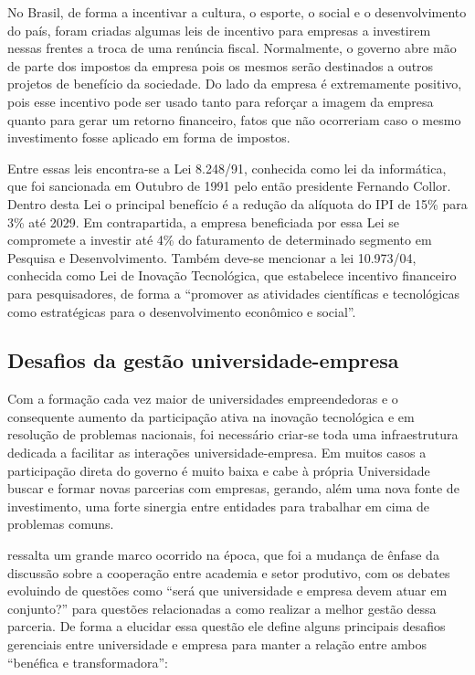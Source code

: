 No Brasil, de forma a incentivar a cultura, o esporte, o social e o desenvolvimento do país, foram criadas algumas leis de incentivo para empresas a investirem nessas frentes a troca de uma renúncia fiscal.  Normalmente, o governo abre mão de parte dos impostos da empresa pois os mesmos serão destinados a outros projetos de benefício da sociedade. Do lado da empresa é extremamente positivo, pois esse incentivo pode ser usado tanto para reforçar a imagem da empresa quanto para gerar um retorno financeiro, fatos que não ocorreriam caso o mesmo investimento fosse aplicado em forma de impostos.

Entre essas leis encontra-se a Lei 8.248/91, conhecida como lei da informática, que foi sancionada em Outubro de 1991 pelo então presidente Fernando Collor. Dentro desta Lei o principal benefício é a redução da alíquota do IPI de 15\% para 3\% até 2029. Em contrapartida, a empresa beneficiada por essa Lei se compromete a investir até 4\% do faturamento de determinado segmento em Pesquisa e Desenvolvimento. Também deve-se mencionar a lei 10.973/04, conhecida como Lei de Inovação Tecnológica, que estabelece incentivo financeiro para pesquisadores, de forma a \enquote{promover as atividades científicas e tecnológicas como estratégicas para o desenvolvimento econômico e social}.

\subsection{Desafios da gestão universidade-empresa}
\label{cha:univ_empreend}

Com a formação cada vez maior de universidades empreendedoras e o consequente aumento da participação ativa na inovação tecnológica e em resolução de problemas nacionais, foi necessário criar-se toda uma infraestrutura dedicada a facilitar as interações universidade-empresa. Em muitos casos a participação direta do governo é muito baixa e cabe à própria Universidade buscar e formar novas parcerias com empresas, gerando, além uma nova fonte de investimento, uma forte sinergia entre entidades para trabalhar em cima de problemas comuns.

 ressalta um grande marco ocorrido na época, que foi a mudança de ênfase da discussão sobre a cooperação entre academia e setor produtivo, com os debates evoluindo de questões como \enquote{será que universidade e empresa devem atuar em conjunto?} para questões relacionadas a como realizar a melhor gestão dessa parceria. De forma a elucidar essa questão ele define alguns principais desafios gerenciais entre universidade e empresa para manter a relação entre ambos \enquote{benéfica e transformadora}:

